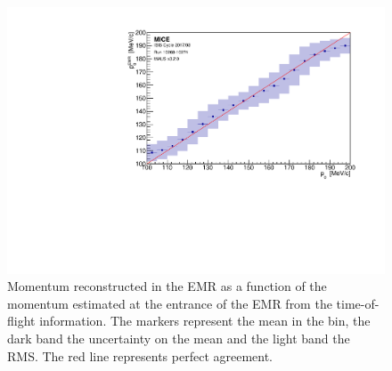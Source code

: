 \begin{figure}[htb!]
	\begin{center}
		\includegraphics[width=0.7\columnwidth]{mom_mom_mean.pdf}
		\caption{Momentum reconstructed in the EMR as a function of the momentum estimated at the entrance of the EMR from the time-of-flight information. The markers represent the mean in the bin, the dark band the uncertainty on the mean and the light band the RMS. The red line represents perfect agreement.}
		\label{fig:emr_momentum}
	\end{center}
\end{figure}


